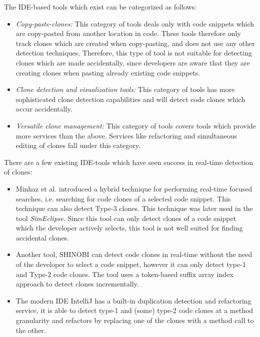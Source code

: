 \documentclass[12pt]{article}
\begin{document}
The IDE-based tools which exist can be categorized as
follows\cite[8]{Udding_Towards_Convenient_Management}:

\begin{itemize}
	\item\textit{Copy-paste-clones:} This category of tools deals only with code snippets which are
	copy-pasted from another location in code. These tools therefore only track clones which
	are created when copy-pasting, and does not use any other detection techniques. Therefore,
	this type of tool is not suitable for detecting clones which are made accidentally, since
	developers are aware that they are creating clones when pasting already existing code
	snippets.

	\item\textit{Clone detection and visualization tools:} This category of tools has more
	sophisticated clone detection capabilities and will detect code clones which occur
	accidentally.

	\item\textit{Versatile clone management:} This category of tools covers tools which provide more
	services than the above. Services like refactoring and simultaneous editing of clones fall
	under this category.
\end{itemize}

There are a few existing IDE-tools which have seen success in real-time detection of clones:

\begin{itemize} \item Minhaz et al. introduced a hybrid technique for performing real-time
	      focused searches, i.e. searching for code clones of a selected code snippet. This
	      technique can also detect Type-3 clones\cite{Zibran_real_time_search}. This technique
	      was later used in the tool
	      \textit{SimEclipse}\cite{Udding_Towards_Convenient_Management}. Since this tool can
	      only detect clones of a code snippet which the developer actively selects, this tool
	      is not well suited for finding accidental clones.

	\item Another tool, SHINOBI can detect code clones in real-time without the need of
	      the developer to select a code snippet, however it can only detect type-1 and
	      Type-2 code clones. The tool uses a token-based suffix array index approach to detect
	      clones incrementally\cite{SHINOBI}.

	\item The modern IDE IntelliJ has a built-in duplication detection and
	      refactoring service, it is able to detect type-1 and (some) type-2 code clones
	      at a method granularity and refactors by replacing one of the clones with a
	      method call to the other.
\end{itemize}
\end{document}
